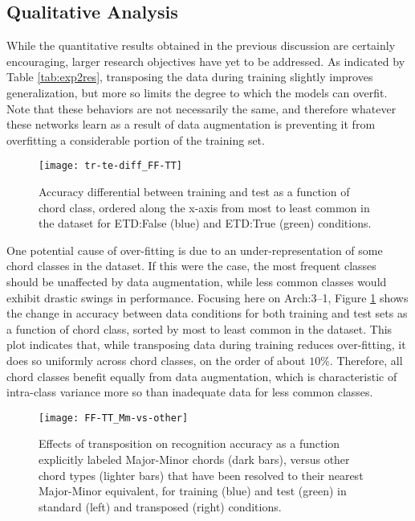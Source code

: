 \subsection{Qualitative Analysis}
\label{subsec:Qualitative_analysis}

While the quantitative results obtained in the previous discussion are certainly encouraging, larger research objectives have yet to be addressed.
As indicated by Table \ref{tab:exp2res}, transposing the data during training slightly improves generalization, but more so limits the degree to which the models can overfit.
Note that these behaviors are not necessarily the same, and therefore whatever these networks learn as a result of data augmentation is preventing it from overfitting a considerable portion of the training set.


\begin{figure}[!t]
\centering
 \centerline{\texttt{[image: tr-te-diff\_FF-TT]}}
\caption{Accuracy differential between training and test as a function of chord class, ordered along the x-axis from most to least common in the dataset for ETD:False (blue) and ETD:True (green) conditions.}
\label{fig:classes}
\end{figure}

One potential cause of over-fitting is due to an under-representation of some chord classes in the dataset.
If this were the case, the most frequent classes should be unaffected by data augmentation, while less common classes would exhibit drastic swings in performance.
Focusing here on Arch:3--1, Figure \ref{fig:classes} shows the change in accuracy between data conditions for both training and test sets as a function of chord class, sorted by most to least common in the dataset.
This plot indicates that, while transposing data during training reduces over-fitting, it does so uniformly across chord classes, on the order of about $10\%$.
Therefore, all chord classes benefit equally from data augmentation, which is characteristic of intra-class variance more so than inadequate data for less common classes.

\begin{figure}[!t]
\centering
\texttt{[image: FF-TT\_Mm-vs-other]}
\caption{Effects of transposition on recognition accuracy as a function explicitly labeled Major-Minor chords (dark bars), versus other chord types (lighter bars) that have been resolved to their nearest Major-Minor equivalent, for training (blue) and test (green) in standard (left) and transposed (right) conditions.}
\label{fig:strict_vs_others}
\end{figure}

